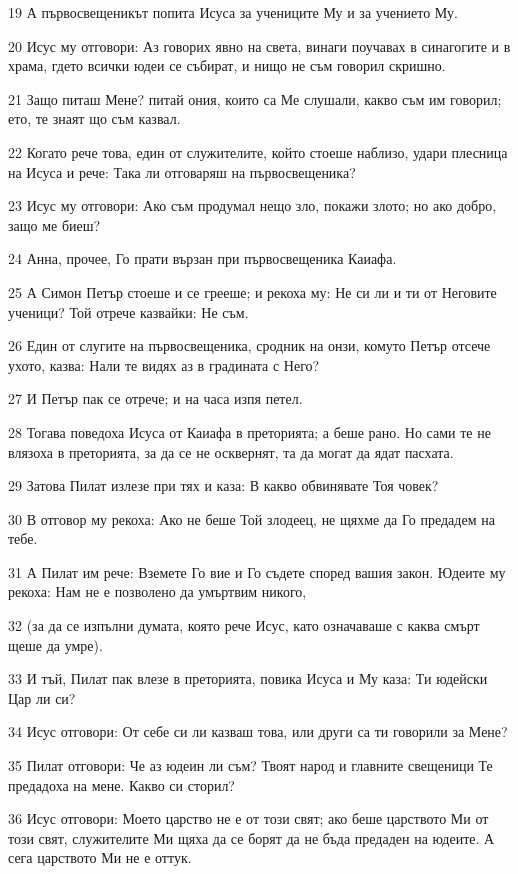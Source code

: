 \par 19 А първосвещеникът попита Исуса за учениците Му и за учението Му.
\par 20 Исус му отговори: Аз говорих явно на света, винаги поучавах в синагогите и в храма, гдето всички юдеи се събират, и нищо не съм говорил скришно.
\par 21 Защо питаш Мене? питай ония, които са Ме слушали, какво съм им говорил; ето, те знаят що съм казвал.
\par 22 Когато рече това, един от служителите, който стоеше наблизо, удари плесница на Исуса и рече: Така ли отговаряш на първосвещеника?
\par 23 Исус му отговори: Ако съм продумал нещо зло, покажи злото; но ако добро, защо ме биеш?
\par 24 Анна, прочее, Го прати вързан при първосвещеника Каиафа.
\par 25 А Симон Петър стоеше и се грееше; и рекоха му: Не си ли и ти от Неговите ученици? Той отрече казвайки: Не съм.
\par 26 Един от слугите на първосвещеника, сродник на онзи, комуто Петър отсече ухото, казва: Нали те видях аз в градината с Него?
\par 27 И Петър пак се отрече; и на часа изпя петел.
\par 28 Тогава поведоха Исуса от Каиафа в преторията; а беше рано. Но сами те не влязоха в преторията, за да се не осквернят, та да могат да ядат пасхата.
\par 29 Затова Пилат излезе при тях и каза: В какво обвинявате Тоя човек?
\par 30 В отговор му рекоха: Ако не беше Той злодеец, не щяхме да Го предадем на тебе.
\par 31 А Пилат им рече: Вземете Го вие и Го съдете според вашия закон. Юдеите му рекоха: Нам не е позволено да умъртвим никого,
\par 32 (за да се изпълни думата, която рече Исус, като означаваше с каква смърт щеше да умре).
\par 33 И тъй, Пилат пак влезе в преторията, повика Исуса и Му каза: Ти юдейски Цар ли си?
\par 34 Исус отговори: От себе си ли казваш това, или други са ти говорили за Мене?
\par 35 Пилат отговори: Че аз юдеин ли съм? Твоят народ и главните свещеници Те предадоха на мене. Какво си сторил?
\par 36 Исус отговори: Моето царство не е от този свят; ако беше царството Ми от този свят, служителите Ми щяха да се борят да не бъда предаден на юдеите. А сега царството Ми не е оттук.
